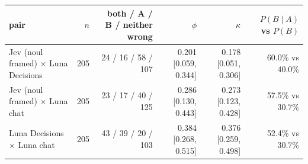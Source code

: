 \begin{tabular}{lrrrrr}
\toprule
pair & $n$ & both / A / B / neither wrong & $\phi$ & $\kappa$ & $P(B \mid A)$ vs $P(B)$ \\
\midrule
Jev (noul framed) $\times$ Luna Decisions & 205 & 24 / 16 / 58 / 107 & 0.201 [0.059, 0.344] & 0.178 [0.051, 0.306] & 60.0\% vs 40.0\% \\
Jev (noul framed) $\times$ Luna chat & 205 & 23 / 17 / 40 / 125 & 0.286 [0.130, 0.443] & 0.273 [0.123, 0.428] & 57.5\% vs 30.7\% \\
Luna Decisions $\times$ Luna chat & 205 & 43 / 39 / 20 / 103 & 0.384 [0.268, 0.515] & 0.376 [0.259, 0.498] & 52.4\% vs 30.7\% \\
\bottomrule
\end{tabular}
